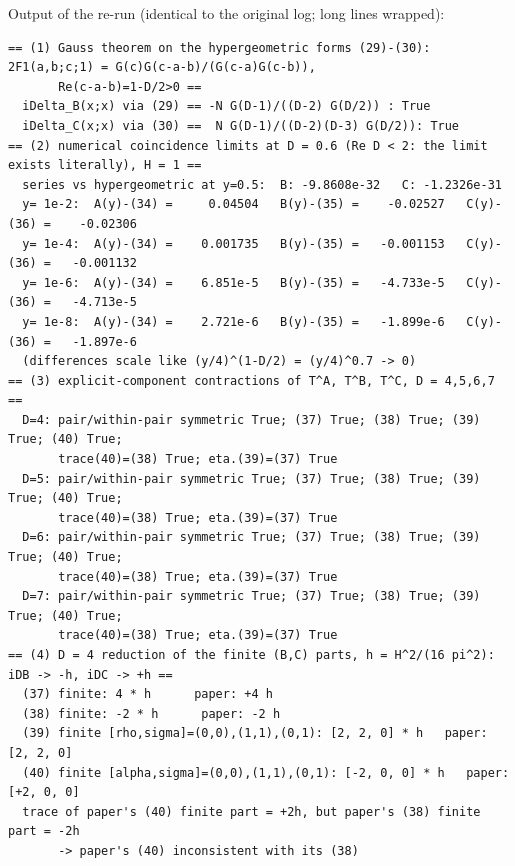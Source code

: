 Output of the re-run (identical to the original log; long lines wrapped):
\begingroup\scriptsize
\begin{verbatim}
== (1) Gauss theorem on the hypergeometric forms (29)-(30): 2F1(a,b;c;1) = G(c)G(c-a-b)/(G(c-a)G(c-b)),
       Re(c-a-b)=1-D/2>0 ==
  iDelta_B(x;x) via (29) == -N G(D-1)/((D-2) G(D/2)) : True
  iDelta_C(x;x) via (30) ==  N G(D-1)/((D-2)(D-3) G(D/2)): True
== (2) numerical coincidence limits at D = 0.6 (Re D < 2: the limit exists literally), H = 1 ==
  series vs hypergeometric at y=0.5:  B: -9.8608e-32   C: -1.2326e-31
  y= 1e-2:  A(y)-(34) =     0.04504   B(y)-(35) =    -0.02527   C(y)-(36) =    -0.02306
  y= 1e-4:  A(y)-(34) =    0.001735   B(y)-(35) =   -0.001153   C(y)-(36) =   -0.001132
  y= 1e-6:  A(y)-(34) =    6.851e-5   B(y)-(35) =   -4.733e-5   C(y)-(36) =   -4.713e-5
  y= 1e-8:  A(y)-(34) =    2.721e-6   B(y)-(35) =   -1.899e-6   C(y)-(36) =   -1.897e-6
  (differences scale like (y/4)^(1-D/2) = (y/4)^0.7 -> 0)
== (3) explicit-component contractions of T^A, T^B, T^C, D = 4,5,6,7 ==
  D=4: pair/within-pair symmetric True; (37) True; (38) True; (39) True; (40) True;
       trace(40)=(38) True; eta.(39)=(37) True
  D=5: pair/within-pair symmetric True; (37) True; (38) True; (39) True; (40) True;
       trace(40)=(38) True; eta.(39)=(37) True
  D=6: pair/within-pair symmetric True; (37) True; (38) True; (39) True; (40) True;
       trace(40)=(38) True; eta.(39)=(37) True
  D=7: pair/within-pair symmetric True; (37) True; (38) True; (39) True; (40) True;
       trace(40)=(38) True; eta.(39)=(37) True
== (4) D = 4 reduction of the finite (B,C) parts, h = H^2/(16 pi^2): iDB -> -h, iDC -> +h ==
  (37) finite: 4 * h      paper: +4 h
  (38) finite: -2 * h      paper: -2 h
  (39) finite [rho,sigma]=(0,0),(1,1),(0,1): [2, 2, 0] * h   paper: [2, 2, 0]
  (40) finite [alpha,sigma]=(0,0),(1,1),(0,1): [-2, 0, 0] * h   paper: [+2, 0, 0]
  trace of paper's (40) finite part = +2h, but paper's (38) finite part = -2h
       -> paper's (40) inconsistent with its (38)
\end{verbatim}
\endgroup

